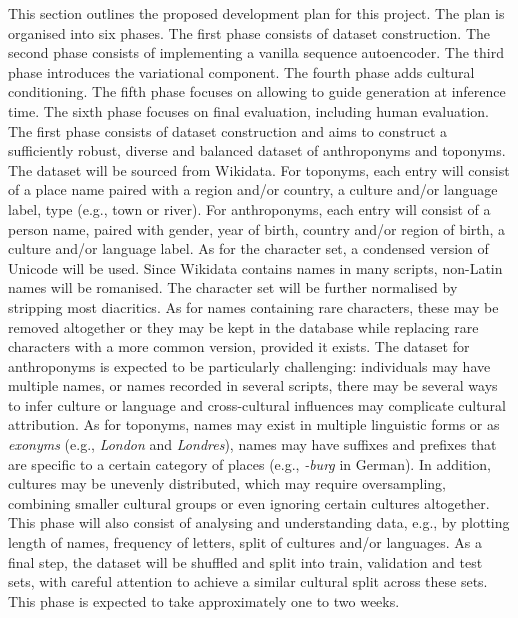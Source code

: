 \documentclass[Main.tex]{subfiles}
\begin{document}
\label{ch:project plan}

This section outlines the proposed development plan for this project. The plan is organised into six phases.
The first phase consists of dataset construction. The second phase consists of implementing a vanilla sequence autoencoder. The third phase introduces the variational component. The fourth phase adds cultural conditioning. The fifth phase focuses on allowing to guide generation at inference time. The sixth phase focuses on final evaluation, including human evaluation.\\

The first phase consists of dataset construction and aims to construct a sufficiently robust, diverse and balanced dataset of anthroponyms and toponyms. 
The dataset will be sourced from Wikidata. For toponyms, each entry will consist of a place name paired with a region and/or country, a culture and/or language label, type (e.g., town or river). For anthroponyms, each entry will consist of a person name, paired with gender, year of birth, country and/or region of birth, a culture and/or language label. As for the character set, a condensed version of Unicode will be used. Since Wikidata contains names in many scripts, non-Latin names will be romanised. The character set will be further normalised by stripping most diacritics. As for names containing rare characters, these may be removed altogether or they may be kept in the database while replacing rare characters with a more common version, provided it exists. The dataset for anthroponyms is expected to be particularly challenging: individuals may have multiple names, or names recorded in several scripts, there may be several ways to infer culture or language and cross-cultural influences may complicate cultural attribution. As for toponyms, names may exist in multiple linguistic forms or as \textit{exonyms} (e.g., \textit{London} and \textit{Londres}), names may have suffixes and prefixes that are specific to a certain category of places (e.g., \textit{-burg} in German). In addition, cultures may be unevenly distributed, which may require oversampling, combining smaller cultural groups or even ignoring certain cultures altogether. This phase will also consist of analysing and understanding data, e.g., by plotting length of names, frequency of letters, split of cultures and/or languages. As a final step, the dataset will be shuffled and split into train, validation and test sets, with careful attention to achieve a similar cultural split across these sets. This phase is expected to take approximately one to two weeks.\\
\end{document}
